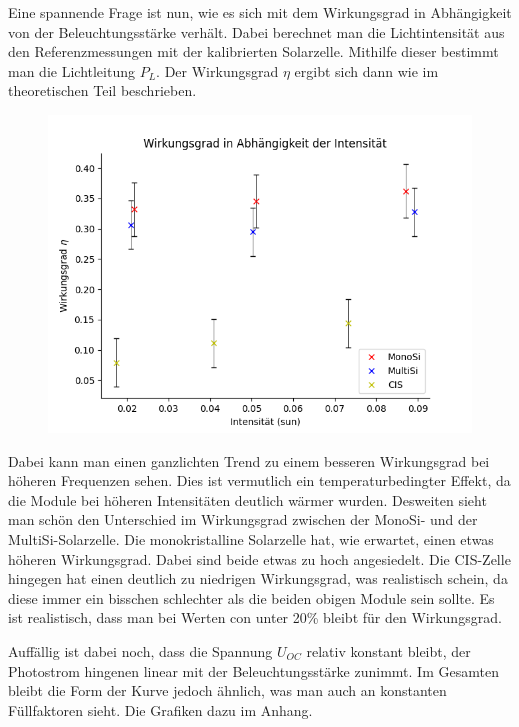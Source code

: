 Eine spannende Frage ist nun, wie es sich mit dem Wirkungsgrad in Abhängigkeit von der Beleuchtungsstärke verhält. 
Dabei berechnet man die Lichtintensität aus den Referenzmessungen mit der kalibrierten Solarzelle. Mithilfe dieser 
bestimmt man die Lichtleitung $P_L$. Der Wirkungsgrad $\eta$ ergibt sich dann wie im theoretischen Teil beschrieben. 

\begin{figure}[h]
    \centering
    \includegraphics[width = \linewidth]{Bilder/PlotWirkungsgradInt.png}
\end{figure}

Dabei kann man einen ganzlichten Trend zu einem besseren Wirkungsgrad bei höheren Frequenzen sehen. Dies ist vermutlich ein 
temperaturbedingter Effekt, da die Module bei höheren Intensitäten deutlich wärmer wurden. Desweiten sieht man schön den Unterschied 
im Wirkungsgrad zwischen der MonoSi- und der MultiSi-Solarzelle. Die monokristalline Solarzelle hat, wie erwartet, einen etwas höheren 
Wirkungsgrad. Dabei sind beide etwas zu hoch angesiedelt. 
Die CIS-Zelle hingegen hat einen deutlich zu niedrigen Wirkungsgrad, was realistisch schein, da diese immer ein bisschen schlechter als die beiden obigen Module 
sein sollte. Es ist realistisch, dass man bei Werten con unter 20\% bleibt für den Wirkungsgrad.\

Auffällig ist dabei noch, dass die Spannung $U_{OC}$ relativ konstant bleibt, der Photostrom hingenen linear mit der Beleuchtungsstärke zunimmt. 
Im Gesamten bleibt die Form der Kurve jedoch ähnlich, was man auch an konstanten Füllfaktoren sieht. Die Grafiken dazu im Anhang.


